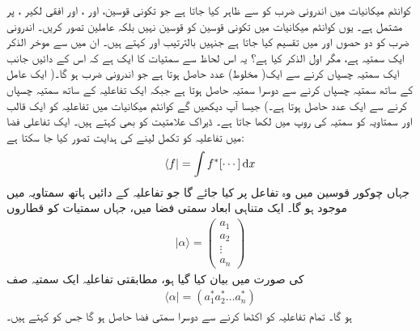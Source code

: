 کوانٹم  میکانیات میں اندرونی ضرب کو  سے ظاہر کیا جاتا ہے جو   تکونی  قوسین،  اور ، اور افقی لکیر ،    پر مشتمل  ہے۔ یوں  کوانٹم میکانیات میں  تکونی  قوسین  کو قوسین نہیں بلکہ عاملین تصور کریں۔ اندرونی ضرب     کو  دو حصوں    اور  میں تقسیم کیا جاتا ہے جنہیں بالترتیب  اور  کہتے ہیں۔  ان میں سے موخر الذکر ایک سمتیہ ہے، مگر اول الذکر کیا ہے؟ یہ اس لحاظ سے سمتیات کا ایک  ہے کہ اس کے دائیں جانب ایک سمتیہ  چسپاں کرنے  سے ایک( مخلوط) عدد حاصل ہوتا ہے جو اندرونی ضرب ہو گا۔( ایک عامل کے ساتھ سمتیہ چسپاں  کرنے  سے دوسرا سمتیہ حاصل ہوتا ہے جبکہ ایک  تفاعلیہ کے ساتھ سمتیہ  چسپاں   کرنے سے ایک عدد حاصل ہوتا ہے۔) جیسا آپ دیکھیں گے کوانٹم  میکانیات میں  تفاعلیہ کو ایک قالب اور سمتاویہ کو سمتیہ کی روپ میں لکھا جاتا ہے۔ ڈیراک علامتیت کو  بھی کہتے ہیں۔ ایک تفاعلی فضا میں تفاعلیہ  کو تکمل لینے کی ہدایت تصور کیا جا سکتا ہے:
\begin{align*}
\langle f | = \int f^{*} [ \cdots ] \dif x
\end{align*}
جہاں چوکور  قوسین  میں وہ تفاعل پر کیا جائے گا جو تفاعلیہ کے دائیں ہاتھ سمتاویہ میں موجود ہو گا۔ ایک متناہی ابعاد سمتی فضا میں، جہاں سمتیات کو قطاروں 
\begin{align}
| \alpha \rangle = \begin{pmatrix}
a_{1} \\ a_{2} \\ \vdots \\ a_{n} 
\end{pmatrix}
\end{align}
کی صورت میں بیان کیا گیا ہو، مطابقتی تفاعلیہ ایک سمتیہ صف 
\begin{align}
\langle \alpha | = ( a_{1}^{*}a_{2}^{*} \dotsc a_{n}^{*})
\end{align}
ہو گا۔ تمام تفاعلیہ کو اکٹھا کرنے سے دوسرا سمتی فضا حاصل ہو گا جس کو کہتے ہیں۔ 

